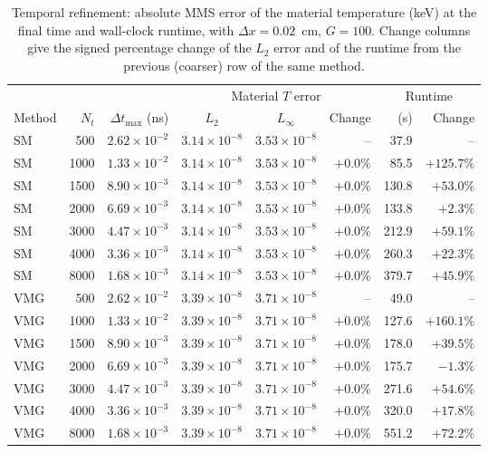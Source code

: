 
\begin{table}[htbp]
  \centering
  \caption{Temporal refinement: absolute MMS error of the material temperature (keV) at the final time and wall-clock runtime, with $\Delta x = 0.02$~cm, $G = 100$. Change columns give the signed percentage change of the $L_2$ error and of the runtime from the previous (coarser) row of the same method.}
  \label{tab:mms-error-dt}
  \begin{tabular}{lrr ccr rr}
    \toprule
    & & & \multicolumn{3}{c}{Material $T$ error} & \multicolumn{2}{c}{Runtime} \\
    \cmidrule(lr){4-6} \cmidrule(lr){7-8}
    Method & $N_t$ & $\Delta t_{\max}$ (ns) & $L_2$ & $L_\infty$ & Change & (s) & Change \\
    \midrule
    SM & 500 & $2.62\times10^{-2}$ & $3.14\times10^{-8}$ & $3.53\times10^{-8}$ & -- & 37.9 & -- \\
    SM & 1000 & $1.33\times10^{-2}$ & $3.14\times10^{-8}$ & $3.53\times10^{-8}$ & $+0.0\%$ & 85.5 & $+125.7\%$ \\
    SM & 1500 & $8.90\times10^{-3}$ & $3.14\times10^{-8}$ & $3.53\times10^{-8}$ & $+0.0\%$ & 130.8 & $+53.0\%$ \\
    SM & 2000 & $6.69\times10^{-3}$ & $3.14\times10^{-8}$ & $3.53\times10^{-8}$ & $+0.0\%$ & 133.8 & $+2.3\%$ \\
    SM & 3000 & $4.47\times10^{-3}$ & $3.14\times10^{-8}$ & $3.53\times10^{-8}$ & $+0.0\%$ & 212.9 & $+59.1\%$ \\
    SM & 4000 & $3.36\times10^{-3}$ & $3.14\times10^{-8}$ & $3.53\times10^{-8}$ & $+0.0\%$ & 260.3 & $+22.3\%$ \\
    SM & 8000 & $1.68\times10^{-3}$ & $3.14\times10^{-8}$ & $3.53\times10^{-8}$ & $+0.0\%$ & 379.7 & $+45.9\%$ \\
    \addlinespace
    VMG & 500 & $2.62\times10^{-2}$ & $3.39\times10^{-8}$ & $3.71\times10^{-8}$ & -- & 49.0 & -- \\
    VMG & 1000 & $1.33\times10^{-2}$ & $3.39\times10^{-8}$ & $3.71\times10^{-8}$ & $+0.0\%$ & 127.6 & $+160.1\%$ \\
    VMG & 1500 & $8.90\times10^{-3}$ & $3.39\times10^{-8}$ & $3.71\times10^{-8}$ & $+0.0\%$ & 178.0 & $+39.5\%$ \\
    VMG & 2000 & $6.69\times10^{-3}$ & $3.39\times10^{-8}$ & $3.71\times10^{-8}$ & $+0.0\%$ & 175.7 & $-1.3\%$ \\
    VMG & 3000 & $4.47\times10^{-3}$ & $3.39\times10^{-8}$ & $3.71\times10^{-8}$ & $+0.0\%$ & 271.6 & $+54.6\%$ \\
    VMG & 4000 & $3.36\times10^{-3}$ & $3.39\times10^{-8}$ & $3.71\times10^{-8}$ & $+0.0\%$ & 320.0 & $+17.8\%$ \\
    VMG & 8000 & $1.68\times10^{-3}$ & $3.39\times10^{-8}$ & $3.71\times10^{-8}$ & $+0.0\%$ & 551.2 & $+72.2\%$ \\
    \bottomrule
  \end{tabular}
\end{table}

